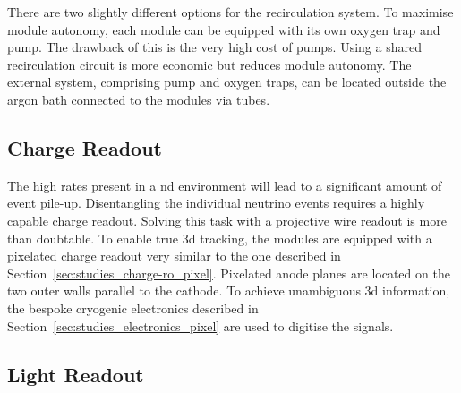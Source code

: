 There are two slightly different options for the recirculation system.
To maximise module autonomy, each module can be equipped with its own oxygen trap and \lar{} pump.
The drawback of this is the very high cost of \lar{} pumps.
Using a shared recirculation circuit is more economic but reduces module autonomy.
The external system, comprising pump and oxygen traps, can be located outside the argon bath connected to the modules via tubes.


\subsection{Charge Readout}
\label{sec:ac_argoncube_charge-ro}

The high rates present in a \gls{nd} environment will lead to a significant amount of event pile-up.
Disentangling the individual neutrino events requires a highly capable charge readout.
Solving this task with a projective wire readout is more than doubtable.
To enable true \gls{3d} tracking, the modules are equipped with a pixelated charge readout very similar to the one described in Section~\ref{sec:studies_charge-ro_pixel}.
Pixelated anode planes are located on the two outer walls parallel to the cathode.
To achieve unambiguous \gls{3d} information, the bespoke \pixlar{} cryogenic electronics described in Section~\ref{sec:studies_electronics_pixel} are used to digitise the signals.


\subsection{Light Readout}
\label{sec:ac_argoncube_light-ro}

